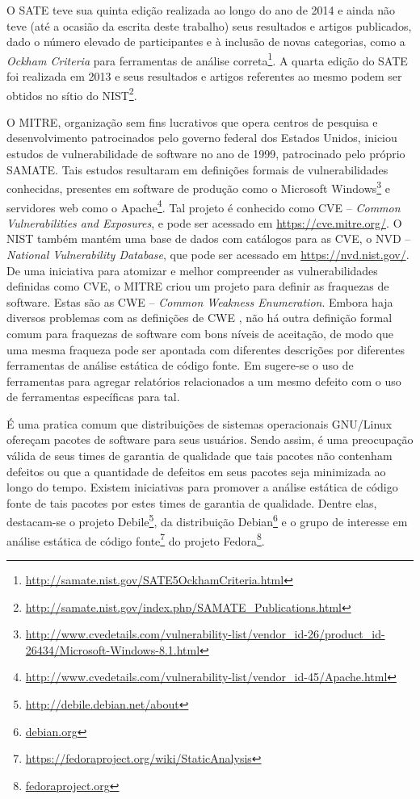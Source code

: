   O SATE teve sua quinta edição realizada ao longo do ano de 2014 e ainda não teve (até a ocasião da escrita deste trabalho) seus resultados e artigos publicados, dado o número elevado de participantes e à inclusão de novas categorias, como a \textit{Ockham Criteria} para ferramentas de análise correta\footnote{\url{http://samate.nist.gov/SATE5OckhamCriteria.html}}. A quarta edição do SATE foi realizada em 2013 e seus resultados e artigos referentes ao mesmo podem ser obtidos no sítio do NIST\footnote{\url{http://samate.nist.gov/index.php/SAMATE_Publications.html}}.


  O MITRE, organização sem fins lucrativos que opera centros de pesquisa e desenvolvimento patrocinados pelo governo federal dos Estados Unidos, iniciou estudos de vulnerabilidade de software no ano de 1999, patrocinado pelo próprio SAMATE. Tais estudos resultaram em definições formais de vulnerabilidades conhecidas, presentes em software de produção como o Microsoft Windows\footnote{\url{http://www.cvedetails.com/vulnerability-list/vendor_id-26/product_id-26434/Microsoft-Windows-8.1.html}} e servidores web como o Apache\footnote{\url{http://www.cvedetails.com/vulnerability-list/vendor_id-45/Apache.html}}. Tal projeto é conhecido como CVE – \textit{Common Vulnerabilities and Exposures}, e pode ser acessado em \url{https://cve.mitre.org/}. O NIST também mantém uma base de dados com catálogos para as CVE, o NVD – \textit{National Vulnerability Database}, que pode ser acessado em \url{https://nvd.nist.gov/}. De uma iniciativa para atomizar e melhor compreender as vulnerabilidades definidas como CVE, o MITRE criou um projeto para definir as fraquezas de software. Estas são as CWE – \textit{Common Weakness Enumeration}. Embora haja diversos problemas com as definições de CWE \cite{yan}, não há outra definição formal comum para fraquezas de software com bons níveis de aceitação, de modo que uma mesma fraqueza pode ser apontada com diferentes descrições por diferentes ferramentas de análise estática de código fonte. Em \cite{clustering} sugere-se o uso de ferramentas para agregar relatórios relacionados a um mesmo defeito com o uso de ferramentas específicas para tal.

  É uma pratica comum que distribuições de sistemas operacionais GNU/Linux ofereçam pacotes de software para seus usuários. Sendo assim, é uma preocupação válida de seus times de garantia de qualidade que tais pacotes não contenham defeitos ou que a quantidade de defeitos em seus pacotes seja minimizada ao longo do tempo. Existem iniciativas para promover a análise estática de código fonte de tais pacotes por estes times de garantia de qualidade. Dentre elas, destacam-se o projeto Debile\footnote{\url{http://debile.debian.net/about}}, da distribuição Debian\footnote{\url{debian.org}} e o grupo de interesse em análise estática de código fonte\footnote{\url{https://fedoraproject.org/wiki/StaticAnalysis}} do projeto Fedora\footnote{\url{fedoraproject.org}}.

